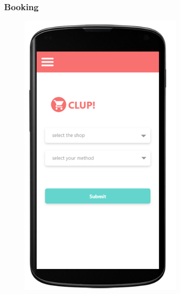 \subsubsection{Booking}
\begin{figure}[H]
  \centering
  \includegraphics[width=0.7\textwidth,keepaspectratio]{images/9.png}
\end{figure}

